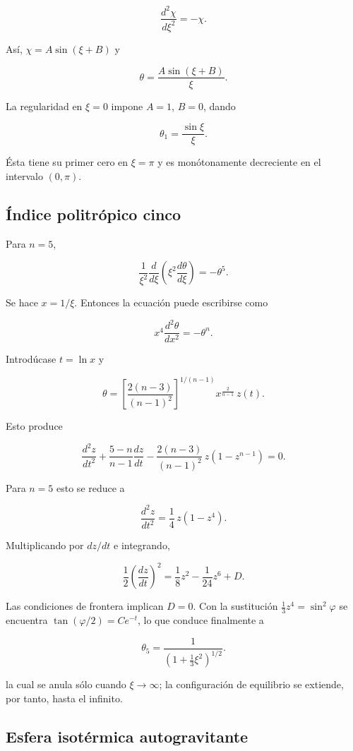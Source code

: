 $$ \frac{d^2\chi}{d\xi^2} = -\chi. $$

Así, $\chi = A\sin(\xi + B)$ y

$$ \theta = \frac{A\sin(\xi + B)}{\xi}. $$

La regularidad en $\xi = 0$ impone $A = 1$, $B = 0$, dando

$$ \theta_1 = \frac{\sin\xi}{\xi}. $$

Ésta tiene su primer cero en $\xi = \pi$ y es monótonamente decreciente en el intervalo $(0, \pi)$.

\subsection{Índice politrópico cinco}

Para $n = 5$,

$$ \frac{1}{\xi^2}\frac{d}{d\xi}\left(\xi^2\frac{d\theta}{d\xi}\right) = -\theta^5. $$

Se hace $x = 1/\xi$. Entonces la ecuación puede escribirse como

$$ x^4\frac{d^2\theta}{dx^2} = -\theta^n. $$

Introdúcase $t = \ln x$ y

$$ \theta = \left[\frac{2(n-3)}{(n-1)^2}\right]^{1/(n-1)} x^{\frac{2}{n-1}}\, z(t). $$

Esto produce

$$ \frac{d^2z}{dt^2} + \frac{5-n}{n-1}\frac{dz}{dt} - \frac{2(n-3)}{(n-1)^2}\,z\left(1 - z^{n-1}\right) = 0. $$

Para $n = 5$ esto se reduce a

$$ \frac{d^2z}{dt^2} = \frac{1}{4}\,z\left(1 - z^4\right). $$

Multiplicando por $dz/dt$ e integrando,

$$ \frac{1}{2}\left(\frac{dz}{dt}\right)^2 = \frac{1}{8}z^2 - \frac{1}{24}z^6 + D. $$

Las condiciones de frontera implican $D = 0$. Con la sustitución $\frac{1}{3}z^4 = \sin^2\varphi$ se encuentra $\tan(\varphi/2) = Ce^{-t}$, lo que conduce finalmente a

$$ \theta_5 = \frac{1}{\left(1 + \frac{1}{3}\xi^2\right)^{1/2}}. $$

la cual se anula sólo cuando $\xi \to \infty$; la configuración de equilibrio se extiende, por tanto, hasta el infinito.

\subsection{Esfera isotérmica autogravitante}

